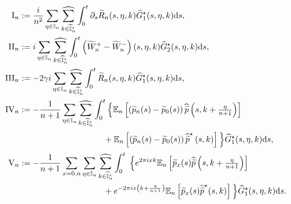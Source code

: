 \documentclass[EJP]{ejpecp} %
\newcommand{\bb}[1]{{\mathbb #1}}
\newcommand\T{{\mathbb I}}
\newcommand{\dd  }{\mathrm{d}}
\renewcommand{\hat}{\widehat}
\renewcommand{\tilde}{\widetilde}
\numberwithin{equation}{section}
\begin{document}
\begin{align*}
\mathrm{I}_n&:=\frac{i}{n^2}\sum_{\eta\in\T_n}\underset{{k\in \widehat{\T}_n^s}}{{\hat\sum}}\int_0^t\partial_s \tilde R_n(s,\eta,k) \hat G^\star_1(s,\eta,k)\dd s,\notag\\
\mathrm{II}_n&:=i\sum_{\eta\in\T_n}\underset{{k\in \widehat{\T}_n^s}}{{\hat\sum}}\int_0^t\left(\tilde W_n^+-\tilde W_n^-\right)(s,\eta,k) \hat
  G^\star_2(s,\eta,k)\dd s,\\
\mathrm{III}_n&:=-2\gamma i\sum_{\eta\in\T_n}\underset{{k\in \widehat{\T}_n^s}}{{\hat\sum}}\int_0^t
\tilde R_n (s,\eta,k) \hat
  G^\star_1(s,\eta,k)\dd s,\notag\\
\mathrm{IV}_{n}&:=-\frac{1}{n+1}\sum_{\eta\in\T_n}\underset{{k\in \widehat{\T}_n^s}}{{\hat\sum}}\int_0^t
\vphantom{\int}
\Big\{\bb E_n\left[
    \left(\tilde p_n(s)-\tilde
  p_0(s)\right)\hat{\tilde{p}}\left(s,k+\tfrac{\eta}{n+1}\right)\right]\\
&
\qquad \qquad\qquad\qquad\qquad +\vphantom{\int}
\bb E_n\left[\left(\tilde p_n(s)-\tilde
  p_0(s)\right)\hat{\tilde{p}}^\star\left(s,k\right)\right]\Big\}\hat
  G_1^\star(s,\eta,k)\dd s,\\
\mathrm{V}_{n} & :=-\frac{1}{n+1}\sum_{x=0,n}\sum_{\eta\in\T_n}\underset{{k\in \widehat{\T}_n^s}}{{\hat\sum}}\int_0^t\; \Big\{e^{2\pi i x k}\bb E_n\left[
   \tilde  p_{x}(s)\hat{\tilde p}\left(s,k+\tfrac{\eta}{n+1}\right)
  \right]
\\
&
\qquad \qquad\qquad\qquad\qquad  +
e^{-2\pi i x \left(k+\frac{\eta}{n+1}\right)}\bb E_n\left[\tilde  p_{x}(s) \hat{\tilde p}^\star(s,k)\right]\Big\}\hat
  G_1^\star(s,\eta,k)\dd s.
\end{align*}
\end{document}
